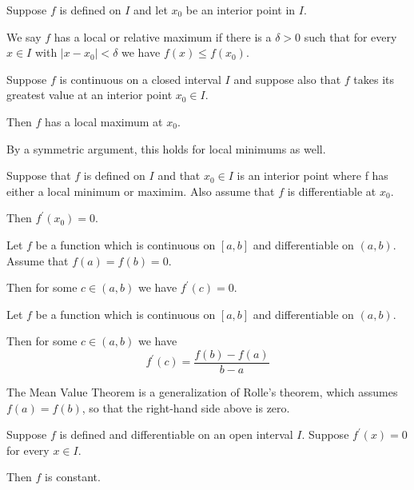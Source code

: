 \begin{defn}
    Suppose $f$ is defined on $I$ and let $x_0$ be an interior point in $I$. 
    
    We say $f$ has a local or relative maximum if there is a $\delta > 0$ such that
    for every $x\in I$ with $|x-x_0| < \delta$ we have $f(x) \leq f(x_0)$.
\end{defn}


\begin{prop}
    Suppose $f$ is continuous on a closed interval $I$ and suppose also that 
    $f$ takes its greatest value at an interior point $x_0 \in I$.

    Then $f$ has a local maximum at $x_0$.
\end{prop}


\begin{remark}
    By a symmetric argument, this holds for local minimums as well.
\end{remark}


\begin{prop}
    Suppose that $f$ is defined on $I$ and that $x_0 \in I$ is an interior point
    where f has either a local minimum or maximim. Also assume that $f$ is 
    differentiable at $x_0$.

    Then $f^\prime(x_0) = 0$.
\end{prop}


\begin{theorem}
    Let $f$ be a function which is continuous on $[a,b]$ and differentiable
    on $(a,b)$. Assume that $f(a)=f(b)=0$.

    Then for some $c \in (a,b)$ we have $f^\prime(c) = 0$.
\end{theorem}


\begin{theorem}
    Let $f$ be a function which is continuous on $[a,b]$ and differentiable
    on $(a,b)$.

    Then for some $c \in (a,b)$ we have 
    \[f^\prime(c) = \frac{f(b)-f(a)}{b-a}\]

    The Mean Value Theorem is a generalization of Rolle's theorem, which assumes 
    $f(a) = f(b)$, so that the right-hand side above is zero.
\end{theorem}


\begin{corollary}
    Suppose $f$ is defined and differentiable on an open interval $I$. 
    Suppose $f^\prime(x) = 0$ for every $x \in I$.

    Then $f$ is constant.
\end{corollary}


